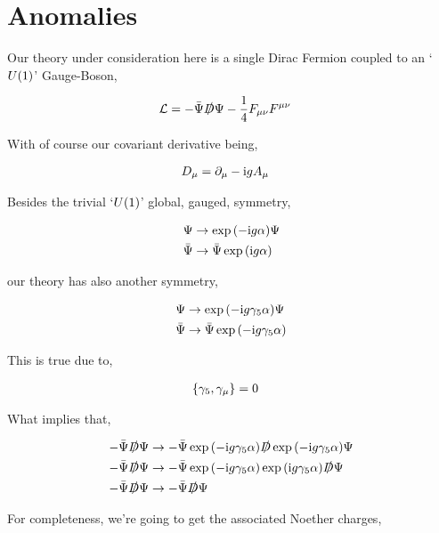 \section{Anomalies}

Our theory under consideration here is a single Dirac Fermion coupled to an `$U\qty(1)$' Gauge-Boson,

\begin{align}
    \mathcal L&=-\bar\Psi\slashed D\Psi-\frac14F_{\mu\nu}F^{\mu\nu}\nonumber
\end{align}

With of course our covariant derivative being,

\begin{align}
    D_\mu &=\partial_\mu-\textnormal{i} gA_\mu\nonumber
\end{align}

Besides the trivial `$U\qty(1)$' global, gauged, symmetry, 

\begin{align}
    \Psi&\rightarrow\exp\qty(-\textnormal{i} g\alpha)\Psi\nonumber\\
    \bar\Psi&\rightarrow\bar\Psi\exp\qty(\textnormal{i} g\alpha)\nonumber
\end{align}

our theory has also another symmetry,

\begin{align}
    \Psi&\rightarrow\exp\qty(-\textnormal{i} g\gamma_5\alpha)\Psi\nonumber\\
    \bar\Psi&\rightarrow\bar\Psi\exp\qty(-\textnormal{i} g\gamma_5\alpha)\nonumber
\end{align}

This is true due to,

\begin{align}
    \acomm{\gamma_5}{\gamma_\mu}&=0\nonumber
\end{align}

What implies that,

\begin{align}
    -\bar\Psi\slashed D\Psi&\rightarrow-\bar\Psi\exp\qty(-\textnormal{i} g\gamma_5\alpha)\slashed D\exp\qty(-\textnormal{i} g\gamma_5\alpha)\Psi\nonumber\\
    -\bar\Psi\slashed D\Psi&\rightarrow-\bar\Psi\exp\qty(-\textnormal{i} g\gamma_5\alpha)\exp\qty(\textnormal{i} g\gamma_5\alpha)\slashed D\Psi\nonumber\\
    -\bar\Psi\slashed D\Psi&\rightarrow-\bar\Psi\slashed D\Psi\nonumber
\end{align}

For completeness, we're going to get the associated Noether charges,

